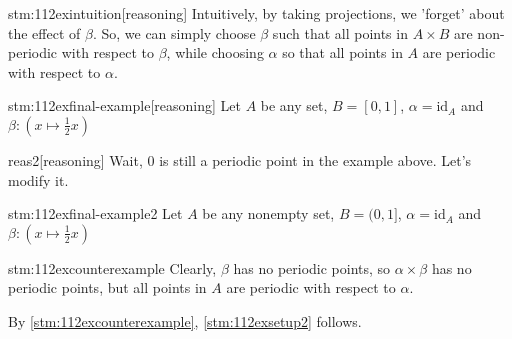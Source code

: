 \begin{stm}{stm:112exintuition}[reasoning]
Intuitively, by taking projections, we 'forget' about the effect of $\beta$. So, we can simply choose $\beta$ such that all points in $A \times B$ are non-periodic with respect to $\beta$, while choosing $\alpha$ so that all points in $A$ are periodic with respect to $\alpha$. 
\end{stm}

\begin{stm}{stm:112exfinal-example}[reasoning]
Let $A$ be any set, $B = [0,1]$, $\alpha = \mathrm{id}_A$ and $\beta: (x \mapsto \frac{1}{2}x)$
\end{stm}

\begin{stm}{reas2}[reasoning]
Wait, $0$ is still a periodic point in the example above. Let's modify it.
\end{stm}

\begin{stm}{stm:112exfinal-example2}
    Let $A$ be any nonempty set, $B = (0,1]$, $\alpha = \mathrm{id}_A$ and $\beta: (x \mapsto \frac{1}{2}x)$
\end{stm}
    
\begin{stm}{stm:112excounterexample}
Clearly, $\beta$ has no periodic points, so $\alpha \times \beta$ has no periodic points, but all points in $A$ are periodic with respect to $\alpha$. 
\end{stm}

\begin{stm}{}
By \ref{stm:112excounterexample}, \ref{stm:112exsetup2} follows.
\end{stm}